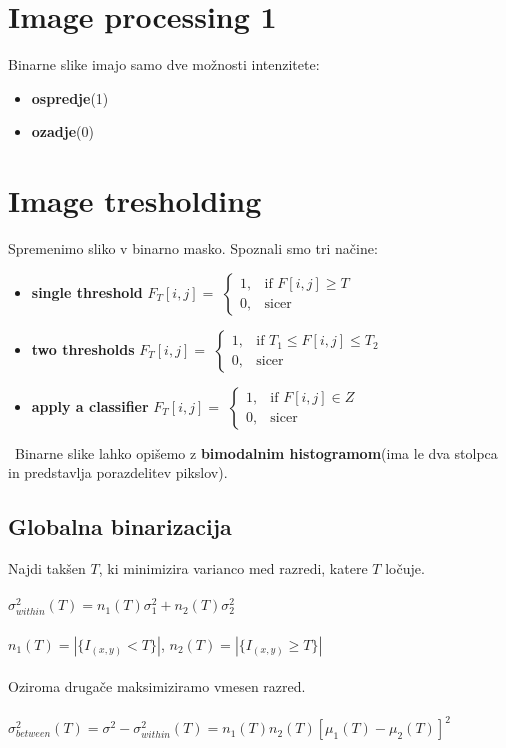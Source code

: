 \documentclass[11pt]{article}
\begin{document}
\newpage

\section{Image processing 1}
Binarne slike imajo samo dve mo\v{z}nosti intenzitete:
\begin{itemize}
\item \textbf{ospredje}(1)
\item \textbf{ozadje}(0)
\end{itemize}

\section{Image tresholding}
Spremenimo sliko v binarno masko. Spoznali smo tri na\v{c}ine:
\begin{itemize}
\item \textbf{single threshold} $F_T[i, j] = $
$
\begin{cases}
	1, & \text{if } F[i, j] \geq T \\
	0, & \text{sicer}
\end{cases}
$
\item \textbf{two thresholds} $F_T[i, j] = $
$
\begin{cases}
	1, & \text{if } T_1 \leq F[i, j] \leq T_2 \\
	0, & \text{sicer}
\end{cases}
$
\item \textbf{apply a classifier} $F_T[i, j] = $
$
\begin{cases}
	1, & \text{if } F[i, j] \in Z \\
	0, & \text{sicer}
\end{cases}
$
\end{itemize}
\
Binarne slike lahko opi\v{s}emo z \textbf{bimodalnim histogramom}(ima le dva stolpca in predstavlja porazdelitev pikslov).

\subsection{Globalna binarizacija}
Najdi tak\v{s}en $T$, ki minimizira varianco med razredi, katere $T$ lo\v{c}uje. \\
\\
\indent $\sigma^2_{within}(T) = n_1(T)\sigma^2_1 + n_2(T)\sigma^2_2$ \\
\\
\indent $n_1(T) = |\{I_{(x, y)} < T\}|$, $n_2(T) = |\{I_{(x, y)} \geq T\}|$ \\
\\
Oziroma druga\v{c}e maksimiziramo vmesen razred. \\
\\
\indent $\sigma^2_{between}(T) = \sigma^2 - \sigma^2_{within}(T) = n_1(T)n_2(T)[\mu_1(T) - \mu_2(T)]^2$
\end{document}
